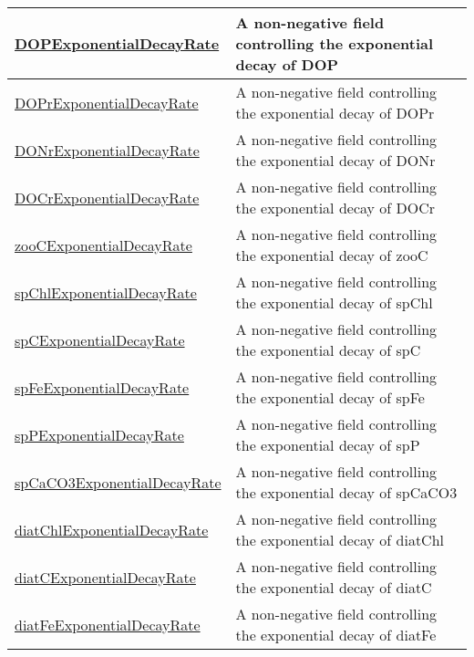 {\begin{center}
\begin{longtable}{| p{2.0in} | p{4.0in} |}
    \hline
    \hyperref[subsec:var_sec_forcing_DOPExponentialDecayRate]{DOPExponentialDecayRate} & A non-negative field controlling the exponential decay of DOP \\
    \hline
    \hyperref[subsec:var_sec_forcing_DOPrExponentialDecayRate]{DOPrExponentialDecayRate} & A non-negative field controlling the exponential decay of DOPr \\
    \hline
    \hyperref[subsec:var_sec_forcing_DONrExponentialDecayRate]{DONrExponentialDecayRate} & A non-negative field controlling the exponential decay of DONr \\
    \hline
    \hyperref[subsec:var_sec_forcing_DOCrExponentialDecayRate]{DOCrExponentialDecayRate} & A non-negative field controlling the exponential decay of DOCr \\
    \hline
    \hyperref[subsec:var_sec_forcing_zooCExponentialDecayRate]{zooCExponentialDecayRate} & A non-negative field controlling the exponential decay of zooC \\
    \hline
    \hyperref[subsec:var_sec_forcing_spChlExponentialDecayRate]{spChlExponentialDecayRate} & A non-negative field controlling the exponential decay of spChl \\
    \hline
    \hyperref[subsec:var_sec_forcing_spCExponentialDecayRate]{spCExponentialDecayRate} & A non-negative field controlling the exponential decay of spC \\
    \hline
    \hyperref[subsec:var_sec_forcing_spFeExponentialDecayRate]{spFeExponentialDecayRate} & A non-negative field controlling the exponential decay of spFe \\
    \hline
    \hyperref[subsec:var_sec_forcing_spPExponentialDecayRate]{spPExponentialDecayRate} & A non-negative field controlling the exponential decay of spP \\
    \hline
    \hyperref[subsec:var_sec_forcing_spCaCO3ExponentialDecayRate]{spCaCO3ExponentialDecayRate} & A non-negative field controlling the exponential decay of spCaCO3 \\
    \hline
    \hyperref[subsec:var_sec_forcing_diatChlExponentialDecayRate]{diatChlExponentialDecayRate} & A non-negative field controlling the exponential decay of diatChl \\
    \hline
    \hyperref[subsec:var_sec_forcing_diatCExponentialDecayRate]{diatCExponentialDecayRate} & A non-negative field controlling the exponential decay of diatC \\
    \hline
    \hyperref[subsec:var_sec_forcing_diatFeExponentialDecayRate]{diatFeExponentialDecayRate} & A non-negative field controlling the exponential decay of diatFe \\

\end{longtable}
\end{center}}
